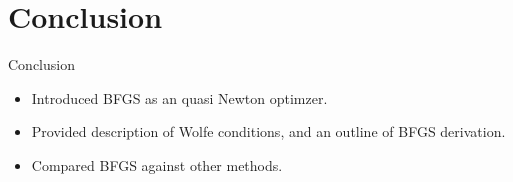 \documentclass{beamer}
\begin{document}

\section{Conclusion}
\begin{frame}{Conclusion}
	\begin{itemize}
		\item Introduced BFGS as an quasi Newton optimzer.
		\item Provided description of Wolfe conditions, and an outline of BFGS derivation.
		\item Compared BFGS against other methods.
	\end{itemize}
\end{frame}
\end{document}

